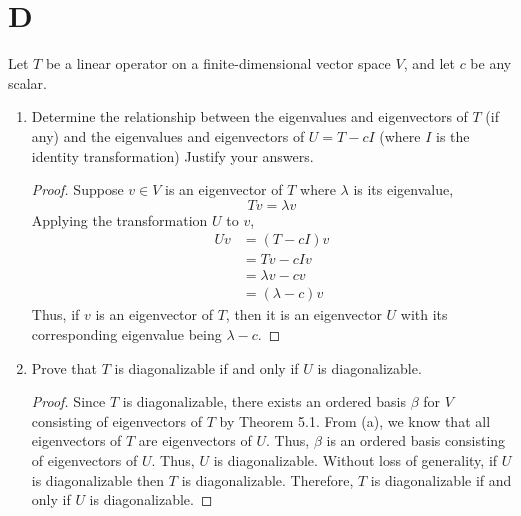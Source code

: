 \documentclass[11pt]{scrartcl}
\begin{document}
\section{D}
Let $T$ be a linear operator on a finite-dimensional vector space $V$, and let $c$ be any scalar.
\begin{enumerate}[label=\alph*.]
	\item{
	      Determine the relationship between the eigenvalues and eigenvectors of $T$ (if any) and the eigenvalues and
	      eigenvectors of $U = T - cI$ (where $I$ is the identity transformation) Justify your answers.
	      \begin{proof}
		      Suppose $v \in V$ is an eigenvector of $T$ where $\lambda$ is its eigenvalue,
		      $$Tv = \lambda v$$
		      Applying the transformation $U$ to $v$,
		      \begin{align*}
			      Uv & = (T - cI)v      \\
			         & = Tv - cIv       \\
			         & = \lambda v - cv \\
			         & = (\lambda - c)v
		      \end{align*}
		      Thus, if $v$ is an eigenvector of $T$, then it is an eigenvector $U$ with its corresponding
		      eigenvalue being $\lambda - c$.
	      \end{proof}
	      }
	\item{
	      Prove that $T$ is diagonalizable if and only if $U$ is diagonalizable.
	      \begin{proof}
		      Since $T$ is diagonalizable, there exists an ordered basis $\beta$ for $V$
		      consisting of eigenvectors of $T$ by Theorem 5.1.
		      From (a), we know that all eigenvectors of $T$ are eigenvectors of $U$.
		      Thus, $\beta$ is an ordered basis consisting of eigenvectors of $U$.
		      Thus, $U$ is diagonalizable. Without loss of generality, if $U$ is diagonalizable
		      then $T$ is diagonalizable. Therefore, $T$ is diagonalizable if and only if $U$ is diagonalizable.

	      \end{proof}
	      }
\end{enumerate}

\end{document}
